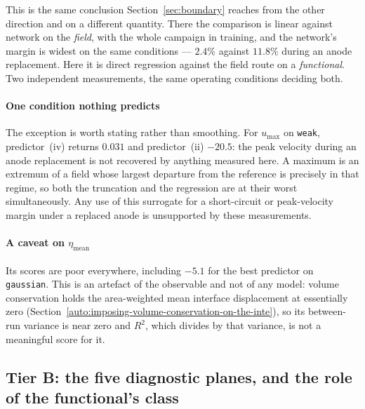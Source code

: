 \documentclass[11pt,a4paper]{article}
\theoremstyle{plain}
\theoremstyle{definition}
\theoremstyle{remark}
\begin{document}
This is the same conclusion Section~\ref{sec:boundary} reaches from the other
direction and on a different quantity. There the comparison is linear against
network on the \emph{field}, with the whole campaign in training, and the
network's margin is widest on the same conditions --- $2.4\%$ against $11.8\%$
during an anode replacement. Here it is direct regression against the field route
on a \emph{functional}. Two independent measurements, the same operating
conditions deciding both.

\paragraph{One condition nothing predicts}
The exception is worth stating rather than smoothing. For $u_{\max}$ on
\texttt{weak}, predictor~(iv) returns $0.031$ and predictor~(ii) $-20.5$: the
peak velocity during an anode replacement is not recovered by anything measured
here. A maximum is an extremum of a field whose largest departure from the
reference is precisely in that regime, so both the truncation and the regression
are at their worst simultaneously. Any use of this surrogate for a
short-circuit or peak-velocity margin under a replaced anode is unsupported by
these measurements.

\paragraph{A caveat on $\eta_{\mathrm{mean}}$}
Its scores are poor everywhere, including $-5.1$ for the best predictor on
\texttt{gaussian}. This is an artefact of the observable and not of any model:
volume conservation holds the area-weighted mean interface displacement at
essentially zero (Section~\ref{auto:imposing-volume-conservation-on-the-inte}),
so its between-run variance is near zero and $R^2$, which divides by that
variance, is not a meaningful score for it.

\subsection{Tier B: the five diagnostic planes, and the role of the functional's class}
\label{sec:tierB}
\end{document}
